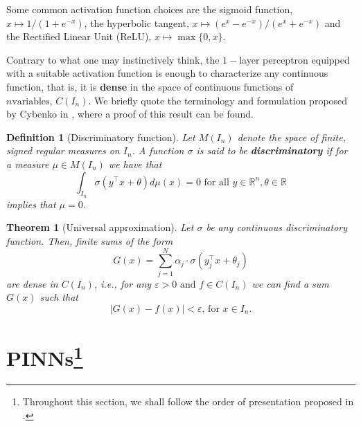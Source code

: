 \documentclass[12pt]{report} %
\newtheorem{definition}{Definition}
\newtheorem{theorem}{Theorem}
\newcommand{\tmstrong}[1]{\textbf{#1}}
\begin{document}
Some common activation function choices are the sigmoid function, $x \mapsto 1/(1 + e^{- x})$, the hyperbolic tangent, $x \mapsto (e^x - e^{- x})/(e^x + e^{- x})$ and the Rectified Linear Unit (ReLU), $x \mapsto \max \{ 0, x \}$. 

Contrary to what one may instinctively think, the $1 -$layer perceptron equipped with a suitable activation function is
enough to characterize any continuous function, that is, it is
{\tmstrong{dense}} in the space of continuous functions of $n \text{
variables, } C (I_n)$. We briefly quote the terminology and formulation
proposed by Cybenko in \cite{cybenko1989approximation}, where a proof of this result can be found.

\begin{definition}[Discriminatory function]
  Let $M (I_n)$ denote the space of finite, signed regular measures on \(I_n\).
  A function \(\sigma\) is said to be {\tmstrong{discriminatory}} if for a
  measure \(\mu \in M (I_n)\) we have that
  \[ \int_{I_n} \sigma (y^{\top} x + \theta) d \mu (x) = 0 \text{ for all } y
     \in \mathbb{R}^n, \theta \in \mathbb{R} \]
  implies that \(\mu = 0\).
\end{definition}

\begin{theorem}[Universal approximation]
  Let \(\sigma\) be any continuous discriminatory function. Then, finite sums of
  the form
  \[ G (x) = \sum_{j = 1}^N \alpha_j \cdot \sigma (y_j^{\top} x + \theta_j) \]
  are dense in \(C (I_n)\), i.e., for any $\varepsilon > 0 \text{ and } f \in C
  (I_n)$ we can find a sum \(G (x)\) such that
  \[ | G (x) - f (x) | < \varepsilon \text{, for } x \in I_n . \]
\end{theorem}



\section[PINNs]{PINNs\footnote{Throughout this section, we shall follow the order of presentation proposed in \cite{cuomo2022scientific}.}}\label{section:pinns}
\end{document}
